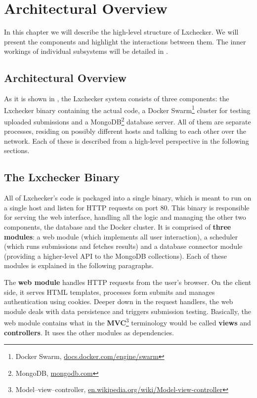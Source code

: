 \chapter{Architectural Overview}
\label{chapter:architecture}

In this chapter we will describe the high-level structure of Lxchecker. We will present the components and highlight the interactions between them. The inner workings of individual subsystems will be detailed in .


\section{Architectural Overview}
\label{sec:arch-overview}


As it is shown in , the Lxchecker system consists of three components: the Lxchecker binary containing the actual code, a Docker Swarm\footnote{Docker Swarm, \url{docs.docker.com/engine/swarm}} cluster for testing uploaded submissions and a MongoDB\footnote{MongoDB, \url{mongodb.com}} database server. All of them are separate processes, residing on possibly different hosts and talking to each other over the network. Each of these is described from a high-level perspective in the following sections.


\section{The Lxchecker Binary}
\label{sec:binary}

All of Lxchecker's code is packaged into a single binary, which is meant to run on a single host and listen for HTTP requests on port 80. This binary is responsible for serving the web interface, handling all the logic and managing the other two components, the database and the Docker cluster. It is comprised of \textbf{three modules}: a web module (which implements all user interaction), a scheduler (which runs submissions and fetches results) and a database connector module (providing a higher-level API to the MongoDB collections). Each of these modules is explained in the following paragraphs.

The \textbf{web module} handles HTTP requests from the user's browser. On the client side, it serves HTML templates, processes form submits and manages authentication using cookies. Deeper down in the request handlers, the web module deals with data persistence and triggers submission testing. Basically, the web module contains what in the \textbf{MVC}\footnote{Model–view–controller, \url{en.wikipedia.org/wiki/Model-view-controller}} terminology would be called \textbf{views} and \textbf{controllers}. It uses the other modules as dependencies.

